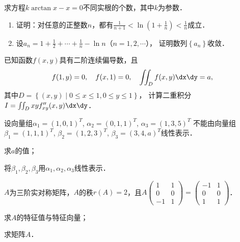 \documentclass[plain,noanswer,medmath]{../../template/jnuexam}
\begin{document}
\begin{problem}[points=10]
求方程$k\arctan x - x = 0$不同实根的个数，其中$k$为参数．
\end{problem}


\begin{problem}[points=10]
\begin{enumerate}
\item
证明：对任意的正整数$n$，都有$\frac{1}{n + 1} < \ln \left(1 + \frac{1}{n} \right) < \frac{1}{n}$成立．
\item
设$a_n = 1 + \frac{1}{2} + \cdots + \frac{1}{n} - \ln n$（$n = 1,2, \cdots$），
证明数列$\left\{a_n \right\}$收敛．
\end{enumerate}
\end{problem}


\begin{problem}[points=11]
已知函数$f(x,y)$具有二阶连续偏导数，且
$$f(1,y) = 0,\quad f(x,1) = 0,\quad \iint_D f(x,y)\dx\dy = a,$$
其中$D = \left\{(x,y)\middle|0 \le x \le 1,0 \le y \le 1 \right\}$，
计算二重积分$I = \iint_D xy f''_{xy}(x,y)\dx\dy$．
\end{problem}


\begin{problem}[points=11]
设向量组$\alpha_1 = (1,0,1)^T$, $\alpha_2 = (0,1,1)^T$, $\alpha_3 = (1,3,5)^T$
不能由向量组$\beta_1 = (1,1,1)^T$, $\beta_2 = (1,2,3)^T$, $\beta_3 = (3,4,a)^T$线性表示．\par
\begin{enumerate*}
\item 求$a$的值；
\item 将$\beta_1,\beta_2,\beta_3$用$\alpha_1,\alpha_2,\alpha_3$线性表示．
\end{enumerate*}
\end{problem}


\begin{problem}[points=11]
$A$为三阶实对称矩阵，$A$的秩$r(A) = 2$，且$A\begin{pmatrix}
   1 & 1 \\
   0 & 0 \\
  -1 & 1
\end{pmatrix} = \begin{pmatrix}
  -1 & 1 \\
   0 & 0 \\
   1 & 1
\end{pmatrix}$．\par
\begin{enumerate*}
\item 求$A$的特征值与特征向量；
\item 求矩阵$A$．
\end{enumerate*}
\end{problem}
\end{document}
